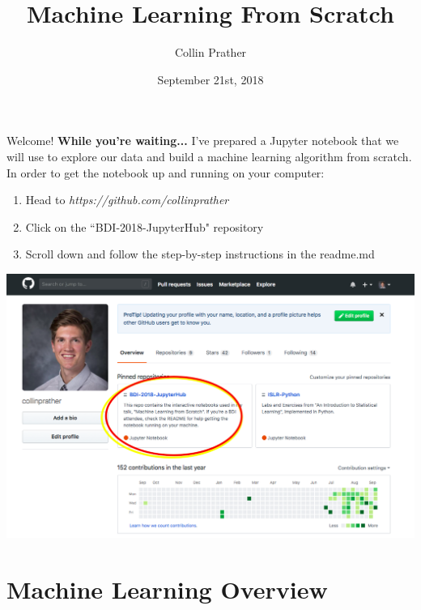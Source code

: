 \documentclass{beamer}
\title{Machine Learning From Scratch}
\author{Collin Prather}
\date{September 21st, 2018}
\begin{document}
\begin{frame}{Welcome!}
\textbf{While you're waiting...}
I've prepared a Jupyter notebook that we will use to explore our data and build a machine learning algorithm from scratch. In order to get the notebook up and running on your computer:\\
\begin{multicols}{2}
	\begin{enumerate}
		\item[1.)] Head to \textit{https://github.com/collinprather}
		\item[2.)] Click on the ``BDI-2018-JupyterHub" repository
		\item[3.)] Scroll down and follow the step-by-step instructions in the readme.md
	\end{enumerate}
	\columnbreak
	\begin{flushright}
		\includegraphics[scale=.122]{Figures/github_profile}
	\end{flushright}
\end{multicols}
\end{frame}

\section{Machine Learning Overview}
\frame{\titlepage}
\end{document}

